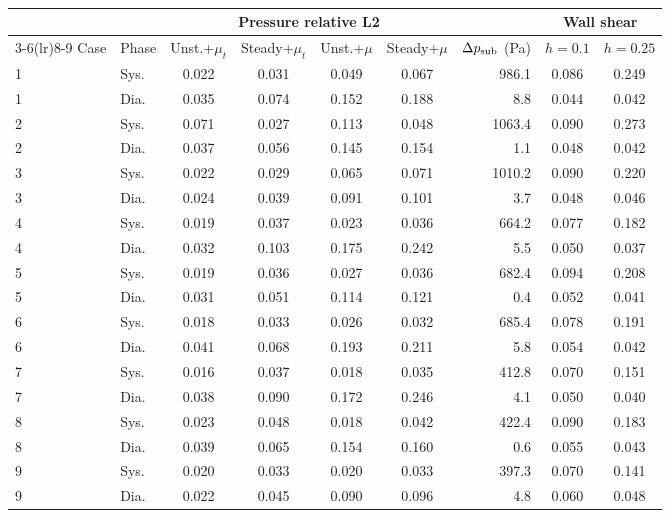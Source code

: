 \begin{table}[htbp]
\centering
\small
\setlength{\tabcolsep}{4pt}
\caption{}
\label{tab:reference_floor}
\begin{tabular}{llccccrcc}
\toprule
 & & \multicolumn{4}{c}{Pressure relative L2} & & \multicolumn{2}{c}{Wall shear} \\
\cmidrule(lr){3-6}\cmidrule(lr){8-9}
Case & Phase & Unst.+$\mu_t$ & Steady+$\mu_t$ & Unst.+$\mu$ & Steady+$\mu$ & $\Delta p_{\rm sub}$ (Pa) & $h=0.1$ & $h=0.25$ \\
\midrule
1 & Sys. & 0.022 & 0.031 & 0.049 & 0.067 & 986.1 & 0.086 & 0.249 \\
1 & Dia. & 0.035 & 0.074 & 0.152 & 0.188 & 8.8 & 0.044 & 0.042 \\
2 & Sys. & 0.071 & 0.027 & 0.113 & 0.048 & 1063.4 & 0.090 & 0.273 \\
2 & Dia. & 0.037 & 0.056 & 0.145 & 0.154 & 1.1 & 0.048 & 0.042 \\
3 & Sys. & 0.022 & 0.029 & 0.065 & 0.071 & 1010.2 & 0.090 & 0.220 \\
3 & Dia. & 0.024 & 0.039 & 0.091 & 0.101 & 3.7 & 0.048 & 0.046 \\
4 & Sys. & 0.019 & 0.037 & 0.023 & 0.036 & 664.2 & 0.077 & 0.182 \\
4 & Dia. & 0.032 & 0.103 & 0.175 & 0.242 & 5.5 & 0.050 & 0.037 \\
5 & Sys. & 0.019 & 0.036 & 0.027 & 0.036 & 682.4 & 0.094 & 0.208 \\
5 & Dia. & 0.031 & 0.051 & 0.114 & 0.121 & 0.4 & 0.052 & 0.041 \\
6 & Sys. & 0.018 & 0.033 & 0.026 & 0.032 & 685.4 & 0.078 & 0.191 \\
6 & Dia. & 0.041 & 0.068 & 0.193 & 0.211 & 5.8 & 0.054 & 0.042 \\
7 & Sys. & 0.016 & 0.037 & 0.018 & 0.035 & 412.8 & 0.070 & 0.151 \\
7 & Dia. & 0.038 & 0.090 & 0.172 & 0.246 & 4.1 & 0.050 & 0.040 \\
8 & Sys. & 0.023 & 0.048 & 0.018 & 0.042 & 422.4 & 0.090 & 0.183 \\
8 & Dia. & 0.039 & 0.065 & 0.154 & 0.160 & 0.6 & 0.055 & 0.043 \\
9 & Sys. & 0.020 & 0.033 & 0.020 & 0.033 & 397.3 & 0.070 & 0.141 \\
9 & Dia. & 0.022 & 0.045 & 0.090 & 0.096 & 4.8 & 0.060 & 0.048 \\
\bottomrule
\end{tabular}
\end{table}

